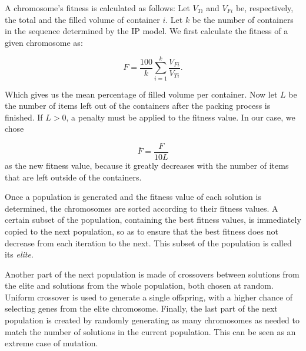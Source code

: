 A chromosome's fitness is calculated as follows: Let $V_{Ti}$ and $V_{Fi}$ be, respectively, the total and the filled volume of container $i$. Let $k$ be the number of containers in the sequence determined by the IP model. We first calculate the fitness of a given chromosome as:

\begin{equation}
    F = \frac{100}{k}\sum_{i=1}^{k}\frac{V_{Fi}}{V_{Ti}}.
\end{equation}

Which gives us the mean percentage of filled volume per container. Now let $L$ be the number of items left out of the containers after the packing process is finished. If $L > 0$, a penalty must be applied to the fitness value. In our case, we chose

\begin{equation}
    \bar{F} = \frac{F}{10L}
\end{equation}
as the new fitness value, because it greatly decreases with the number of items that are left outside of the containers.

Once a population is generated and the fitness value of each solution is determined, the chromosomes are sorted according to their fitness values. A certain subset of the population, containing the best fitness values, is immediately copied to the next population, so as to ensure that the best fitness does not decrease from each iteration to the next. This subset of the population is called its \emph{elite}.

Another part of the next population is made of crossovers between solutions from the elite and solutions from the whole population, both chosen at random. Uniform crossover is used to generate a single offspring, with a higher chance of selecting genes from the elite chromosome. Finally, the last part of the next population is created by randomly generating as many chromosomes as needed to match the number of solutions in the current population. This can be seen as an extreme case of mutation.